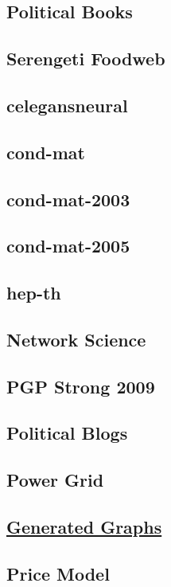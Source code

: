 \documentclass[twocolumn,twoside]{IEEEtran}
\begin{document}
\subsection*{Political Books}


\subsection*{Serengeti Foodweb}


\subsection*{celegansneural}
\subsection*{cond-mat}
\subsection*{cond-mat-2003}
\subsection*{cond-mat-2005}
\subsection*{hep-th}
\subsection*{Network Science}
\subsection*{PGP Strong 2009}
\subsection*{Political Blogs}
\subsection*{Power Grid}

\subsection*{\underline{Generated Graphs}}

\subsection*{Price Model}
\end{document}
